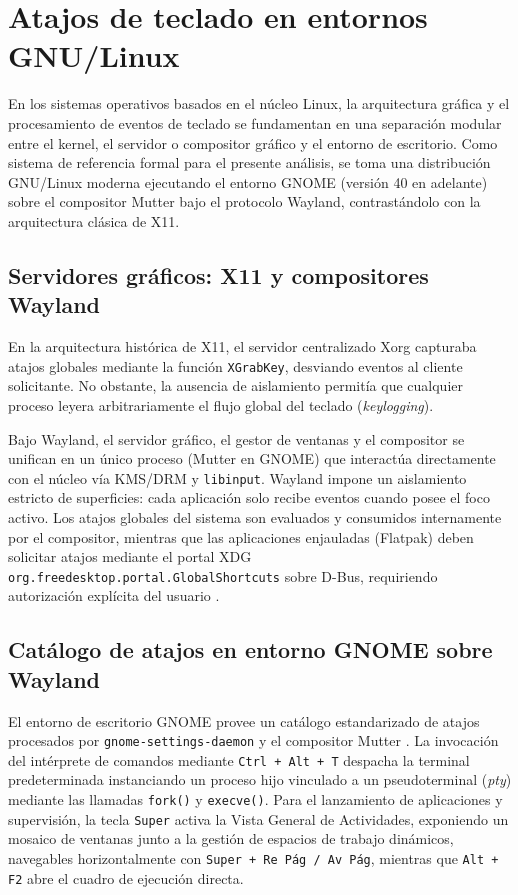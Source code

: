 \documentclass[12pt]{article}
\begin{document}
\section{Atajos de teclado en entornos GNU/Linux}
\label{sec:atajosTecladoLinux}

En los sistemas operativos basados en el núcleo Linux, la arquitectura gráfica y el procesamiento de eventos de teclado se fundamentan en una separación modular entre el kernel, el servidor o compositor gráfico y el entorno de escritorio. Como sistema de referencia formal para el presente análisis, se toma una distribución GNU/Linux moderna ejecutando el entorno GNOME (versión 40 en adelante) sobre el compositor Mutter bajo el protocolo Wayland, contrastándolo con la arquitectura clásica de X11.

\subsection{Servidores gráficos: X11 y compositores Wayland}
\label{subsec:servidoresGraficosLinux}

En la arquitectura histórica de X11, el servidor centralizado Xorg capturaba atajos globales mediante la función \texttt{XGrabKey}, desviando eventos al cliente solicitante. No obstante, la ausencia de aislamiento permitía que cualquier proceso leyera arbitrariamente el flujo global del teclado (\textit{keylogging}).

Bajo Wayland, el servidor gráfico, el gestor de ventanas y el compositor se unifican en un único proceso (Mutter en GNOME) que interactúa directamente con el núcleo vía KMS/DRM y \texttt{libinput}. Wayland impone un aislamiento estricto de superficies: cada aplicación solo recibe eventos cuando posee el foco activo. Los atajos globales del sistema son evaluados y consumidos internamente por el compositor, mientras que las aplicaciones enjauladas (Flatpak) deben solicitar atajos mediante el portal XDG \texttt{org.freedesktop.portal.GlobalShortcuts} sobre D-Bus, requiriendo autorización explícita del usuario \parencite{freedesktopGlobalShortcuts}.

\subsection{Catálogo de atajos en entorno GNOME sobre Wayland}
\label{subsec:catalogoAtajosGnome}

El entorno de escritorio GNOME provee un catálogo estandarizado de atajos procesados por \texttt{gnome-settings-daemon} y el compositor Mutter \parencite{gnomeShellShortcuts}. La invocación del intérprete de comandos mediante \texttt{Ctrl + Alt + T} despacha la terminal predeterminada instanciando un proceso hijo vinculado a un pseudoterminal (\textit{pty}) mediante las llamadas \texttt{fork()} y \texttt{execve()}. Para el lanzamiento de aplicaciones y supervisión, la tecla \texttt{Super} activa la Vista General de Actividades, exponiendo un mosaico de ventanas junto a la gestión de espacios de trabajo dinámicos, navegables horizontalmente con \texttt{Super + Re Pág / Av Pág}, mientras que \texttt{Alt + F2} abre el cuadro de ejecución directa.
\end{document}
